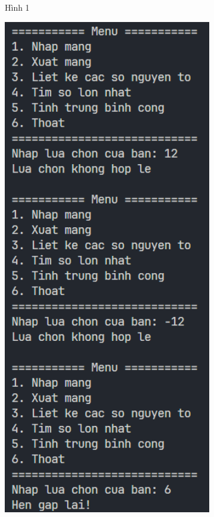 \documentclass[a4paper,12pt]{report}
\begin{document}
\begin{figure}[!ht]
\begin{subfigure}{0.28\textwidth}
		\caption{Hình 1}
	\end{subfigure}
	\hfill
	\begin{subfigure}{0.32\textwidth}
		\centering
		\includegraphics[width=1\textwidth]{imgs/5_3.png}

\end{subfigure}
\end{figure}
\end{document}
